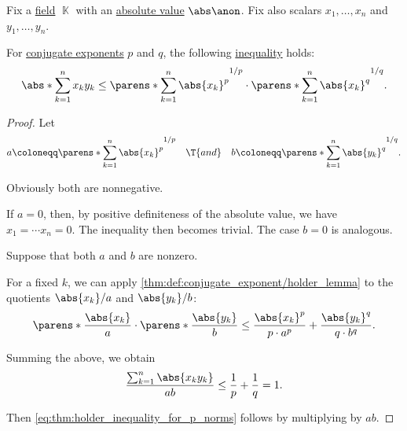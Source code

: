\begin{theorem}\label{thm:holder_inequality_for_p_norms}
  Fix a \hyperref[def:field]{field} \( \BbbK \) with an \hyperref[def:absolute_value]{absolute value} \( \abs\anon \). Fix also scalars \( x_1, \ldots, x_n \) and \( y_1, \ldots, y_n \).

  For \hyperref[def:conjugate_exponent]{conjugate exponents} \( p \) and \( q \), the following \hyperref[def:inequality]{inequality} holds:
  \begin{equation}\label{eq:thm:holder_inequality_for_p_norms}
    \abs*{ \sum_{k=1}^n x_k y_k } \leq \parens*{ \sum_{k=1}^n \abs{x_k}^p }^{1 / p} \cdot \parens*{ \sum_{k=1}^n \abs{x_k}^q }^{1 / q}.
  \end{equation}
\end{theorem}
\begin{proof}
  Let
  \begin{align*}
    a \coloneqq \parens*{ \sum_{k=1}^n \abs{x_k}^p }^{1 / p}
    &&\T{and}&&
    b \coloneqq \parens*{ \sum_{k=1}^n \abs{y_k}^q }^{1 / q}.
  \end{align*}

  Obviously both are nonnegative.

  If \( a = 0 \), then, by positive definiteness of the absolute value, we have \( x_1 = \cdots x_n = 0 \). The inequality then becomes trivial. The case \( b = 0 \) is analogous.

  Suppose that both \( a \) and \( b \) are nonzero.

  For a fixed \( k \), we can apply \cref{thm:def:conjugate_exponent/holder_lemma} to the quotients \( \abs{ x_k } / a \) and \( \abs{ y_k } / b \):
  \begin{equation*}
    \parens*{ \frac {\abs{ x_k }} a } \cdot \parens*{ \frac {\abs{ y_k }} b }
    \leq
    \frac {\abs{ x_k }^p} {p \cdot a^p} + \frac {\abs{ y_k }^q} {q \cdot b^q}.
  \end{equation*}

  Summing the above, we obtain
  \begin{equation*}
    \frac {\sum_{k=1}^n \abs{ x_k y_k }} {ab}
    \leq
    \frac 1 p + \frac 1 q = 1.
  \end{equation*}

  Then \eqref{eq:thm:holder_inequality_for_p_norms} follows by multiplying by \( ab \).
\end{proof}

